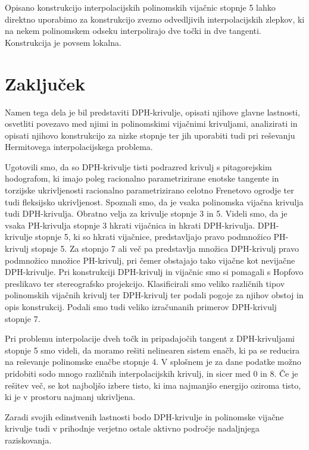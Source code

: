 \documentclass[12pt,a4paper,twoside]{article}
\theoremstyle{definition} %
\theoremstyle{plain} %
\theoremstyle{primerstyle}
\numberwithin{equation}{section}  %
\begin{document}
Opisano konstrukcijo interpolacijskih polinomskih vijačnic stopnje 5 lahko direktno uporabimo za konstrukcijo zvezno odvedljivih interpolacijskih zlepkov, ki na nekem polinomskem odseku interpolirajo dve točki in dve tangenti. Konstrukcija je povsem lokalna.
\clearpage
\section{Zaključek}

Namen tega dela je bil predstaviti DPH-krivulje, opisati njihove glavne lastnosti, osvetliti povezavo med njimi in polinomskimi vijačnimi krivuljami, analizirati in opisati njihovo konstrukcijo za nizke stopnje ter jih uporabiti tudi pri reševanju Hermitovega interpolacijskega problema.

Ugotovili smo, da so DPH-krivulje tisti podrazred krivulj s pitagorejskim hodografom, ki imajo poleg racionalno parametrizirane enotske tangente in torzijske ukrivljenosti racionalno parametrizirano celotno Frenetovo ogrodje ter tudi fleksijsko ukrivljenost. Spoznali smo, da je vsaka polinomska vijačna krivulja tudi DPH-krivulja. Obratno velja za krivulje stopnje 3 in 5. Videli smo, da je vsaka PH-krivulja stopnje 3 hkrati vijačnica in hkrati DPH-krivulja. DPH-krivulje stopnje 5, ki so hkrati vijačnice, predstavljajo pravo podmnožico PH-krivulj stopnje 5. Za stopnjo 7 ali več pa predstavlja množica DPH-krivulj pravo podmnožico množice PH-krivulj, pri čemer obstajajo tako vijačne kot nevijačne DPH-krivulje. Pri konstrukciji DPH-krivulj in vijačnic smo si pomagali s Hopfovo preslikavo ter stereografsko projekcijo. Klasificirali smo veliko različnih tipov polinomskih vijačnih krivulj ter DPH-krivulj ter podali pogoje za njihov obstoj in opis konstrukcij. Podali smo tudi veliko izračunanih primerov DPH-krivulj stopnje 7.

Pri problemu interpolacije dveh točk in pripadajočih tangent z DPH-krivuljami stopnje 5 smo videli, da moramo rešiti nelinearen sistem enačb, ki pa se reducira na reševanje polinomske enačbe stopnje 4. V splošnem je za dane podatke možno pridobiti sodo mnogo različnih interpolacijskih krivulj, in sicer med 0 in 8. Če je rešitev več, se kot najboljšo izbere tisto, ki ima najmanjšo energijo oziroma tisto, ki je v prostoru najmanj ukrivljena.

Zaradi svojih edinstvenih lastnosti bodo DPH-krivulje in polinomske vijačne krivulje tudi v prihodnje verjetno ostale aktivno področje nadaljnjega raziskovanja. 
\end{document}
